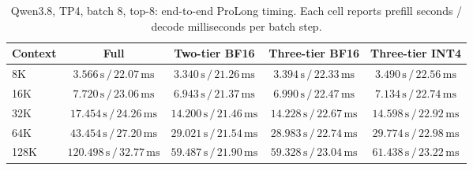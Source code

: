 \begin{table}[t]
\centering
\small
\caption{Qwen3.8, TP4, batch 8, top-8: end-to-end ProLong timing. Each cell reports prefill seconds / decode milliseconds per batch step.}
\label{tab:prolong-qwen38-tp4-b8-end-to-end}
\begin{tabular}{lcccc}
\toprule
Context & Full & Two-tier BF16 & Three-tier BF16 & Three-tier INT4 \\
\midrule
8K & \(3.566\,\mathrm{s}\,/\,22.07\,\mathrm{ms}\) & \(3.340\,\mathrm{s}\,/\,21.26\,\mathrm{ms}\) & \(3.394\,\mathrm{s}\,/\,22.33\,\mathrm{ms}\) & \(3.490\,\mathrm{s}\,/\,22.56\,\mathrm{ms}\) \\
16K & \(7.720\,\mathrm{s}\,/\,23.06\,\mathrm{ms}\) & \(6.943\,\mathrm{s}\,/\,21.37\,\mathrm{ms}\) & \(6.990\,\mathrm{s}\,/\,22.47\,\mathrm{ms}\) & \(7.134\,\mathrm{s}\,/\,22.74\,\mathrm{ms}\) \\
32K & \(17.454\,\mathrm{s}\,/\,24.26\,\mathrm{ms}\) & \(14.200\,\mathrm{s}\,/\,21.46\,\mathrm{ms}\) & \(14.228\,\mathrm{s}\,/\,22.67\,\mathrm{ms}\) & \(14.598\,\mathrm{s}\,/\,22.92\,\mathrm{ms}\) \\
64K & \(43.454\,\mathrm{s}\,/\,27.20\,\mathrm{ms}\) & \(29.021\,\mathrm{s}\,/\,21.54\,\mathrm{ms}\) & \(28.983\,\mathrm{s}\,/\,22.74\,\mathrm{ms}\) & \(29.774\,\mathrm{s}\,/\,22.98\,\mathrm{ms}\) \\
128K & \(120.498\,\mathrm{s}\,/\,32.77\,\mathrm{ms}\) & \(59.487\,\mathrm{s}\,/\,21.90\,\mathrm{ms}\) & \(59.328\,\mathrm{s}\,/\,23.04\,\mathrm{ms}\) & \(61.438\,\mathrm{s}\,/\,23.22\,\mathrm{ms}\) \\
\bottomrule
\end{tabular}
\end{table}

